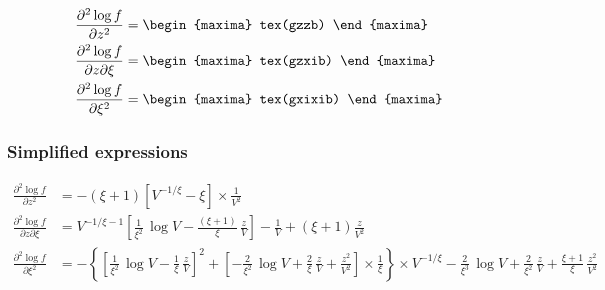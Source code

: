 {\color{MonVertF}
\begin{align*}
  \frac{\partial^2 \log f}{\partial z^2}
  &=
  \begin{maxima}
    tex(gzzb)
  \end{maxima}\\
  \frac{\partial^2 \log f}{\partial z \partial \xi}
  &=
  \begin{maxima}
    tex(gzxib)
  \end{maxima}\\
  \frac{\partial^2 \log f}{\partial \xi^2}
  &=
  \begin{maxima}
    tex(gxixib)
  \end{maxima}
\end{align*}
}

\subsubsection*{Simplified expressions}
{\color{red}
\begin{align*}
  \frac{\partial^2 \log f}{\partial z^2}
  &= - (\xi + 1) \left[V^{-1/\xi} - \xi\right] \times \frac{1}{ V^2}\\
  \frac{\partial^2 \log f}{\partial z \partial \xi}
  &=  V^{-1/\xi -1}
    \left[\frac{1}{\xi^2} \,\log V - \frac{(\xi + 1)}{\xi}\,\frac{z}{V} \right]
    - \frac{1}{V} + (\xi +1) \frac{z}{V^2}   \\
  \frac{\partial^2 \log f}{\partial \xi^2} 
  &= - \left\{ \left[\frac{1}{\xi^2} \, \log V - \frac{1}{\xi}\,\frac{z}{V} \right]^2 +
    \left[ - \frac{2}{\xi^2}\,\log V + \frac{2}{\xi}\,\frac{z}{V}
    + \frac{z^2}{V^2}\right] \times
    \frac{1}{\xi} \right\} \times V^{-1/\xi} - \frac{2}{\xi^3}\,\log V +
    \frac{2}{\xi^2}\,\frac{z}{V} + \frac{\xi +1}{\xi}\, \frac{z^2}{V^2}
\end{align*}
}




